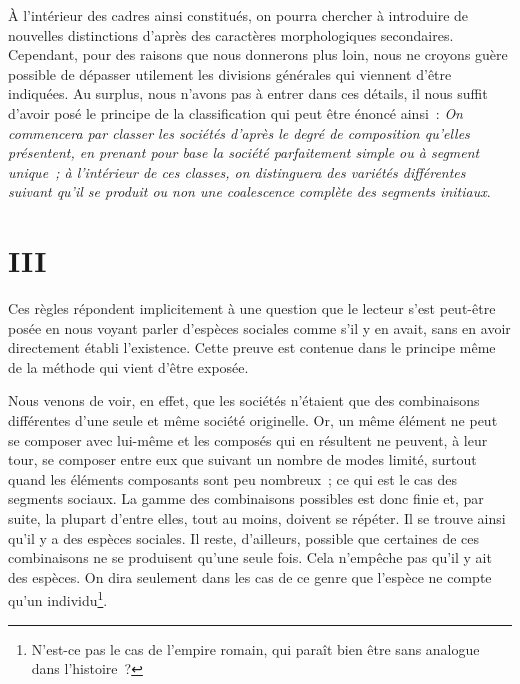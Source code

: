 \documentclass[french,twoside]{book} %
\begin{document}
À l’intérieur des cadres ainsi constitués, on pourra chercher à introduire de nouvelles distinctions d’après des caractères morphologiques secondaires. Cependant, pour des raisons que nous donnerons plus loin, nous ne croyons guère possible de dépasser utilement les divisions générales qui viennent d’être indiquées. Au surplus, nous n’avons pas à entrer dans ces détails, il nous suffit d’avoir posé le principe de la classification qui peut être énoncé ainsi : {\itshape On commencera par classer les sociétés d’après le degré de composition qu’elles présentent, en prenant pour base la société parfaitement simple ou à segment unique ; à l’intérieur de ces classes, on distinguera des variétés différentes suivant qu’il se produit ou non une coalescence complète des segments initiaux}.
\section[{III}]{III}
\noindent Ces règles répondent implicitement à une question que le lecteur s’est peut-être posée en nous voyant parler d’espèces sociales comme s’il y en avait, sans en avoir directement établi l’existence. Cette preuve est contenue dans le principe même de la méthode qui vient d’être exposée.\par
Nous venons de voir, en effet, que les sociétés n’étaient que des combinaisons différentes d’une seule et même société originelle. Or, un même élément ne peut se composer avec lui-même et les composés qui en résultent ne peuvent, à leur tour, se composer entre eux que suivant un nombre de modes limité, surtout quand les éléments composants sont peu nombreux ; ce qui est le cas des segments sociaux. La gamme des combinaisons possibles est donc finie et, par suite, la plupart d’entre elles, tout au moins, doivent se répéter. Il se trouve ainsi qu’il y a des espèces sociales. Il reste, d’ailleurs, possible que certaines de ces combinaisons ne se produisent qu’une seule fois. Cela n’empêche pas qu’il y ait des espèces. On dira seulement dans les cas de ce genre que l’espèce ne compte qu’un individu\footnote{ N’est-ce pas le cas de l’empire romain, qui paraît bien être sans analogue dans l’histoire ?}.\par
\end{document}
